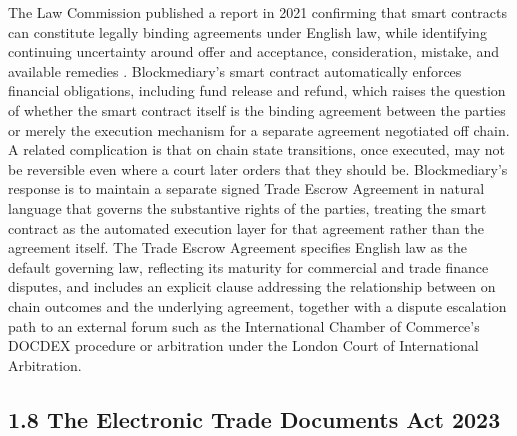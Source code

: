 \documentclass[12pt, a4paper]{article}
\begin{document}
The Law Commission published a report in 2021 confirming that smart contracts can
constitute legally binding agreements under English law, while identifying continuing
uncertainty around offer and acceptance, consideration, mistake, and available remedies
\citep{lawcommission2021}. Blockmediary's smart contract automatically enforces financial
obligations, including fund release and refund, which raises the question of whether the
smart contract itself is the binding agreement between the parties or merely the execution
mechanism for a separate agreement negotiated off chain. A related complication is that on
chain state transitions, once executed, may not be reversible even where a court later
orders that they should be. Blockmediary's response is to maintain a separate signed Trade
Escrow Agreement in natural language that governs the substantive rights of the parties,
treating the smart contract as the automated execution layer for that agreement rather than
the agreement itself. The Trade Escrow Agreement specifies English law as the default
governing law, reflecting its maturity for commercial and trade finance disputes, and
includes an explicit clause addressing the relationship between on chain outcomes and the
underlying agreement, together with a dispute escalation path to an external forum such as
the International Chamber of Commerce's DOCDEX procedure or arbitration under the London
Court of International Arbitration.

\subsection*{1.8 The Electronic Trade Documents Act 2023}
\end{document}
